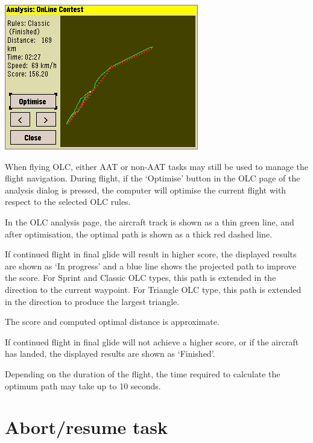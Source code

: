 \documentclass[a4paper,12pt]{refrep}
\begin{document}
\begin{center}
\includegraphics[angle=0,width=\linewidth,keepaspectratio='true']{figures/shot-olc.png}
\end{center}

  When flying OLC, either AAT or non-AAT tasks may still be used to
  manage the flight navigation.  During flight, if the `Optimise'
  button in the OLC page of the analysis dialog is pressed, the
  computer will optimise the current flight with respect to the
  selected OLC rules.  

  In the OLC analysis page, the aircraft track is shown as a thin
  green line, and after optimisation, the optimal path is shown as a
  thick red dashed line.

  If continued flight in final glide will result
  in higher score, the displayed results are shown as `In progress'
  and a blue line shows the projected path to improve the score.
  For Sprint and Classic OLC types, this path is extended in the direction
  to the current waypoint.  For Triangle OLC type, this path is extended
  in the direction to produce the largest triangle.

  The score and computed optimal distance is approximate.

  If continued flight in final glide will not achieve a higher score,
  or if the aircraft has landed, the displayed results are shown as
  `Finished'.  

  Depending on the duration of the flight, the time required to
  calculate the optimum path may take up to 10 seconds.

\section{Abort/resume task}
\end{document}

